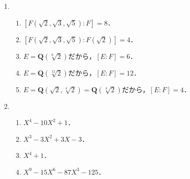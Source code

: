 \documentclass[a4paper,10pt]{ltjsarticle}
\begin{document}
\begin{enumerate}[]
  \item \label{enshu:1.16} \ 
  \begin{enumerate}
    \item \label{enshu:1.16.1} $[F(\sqrt{2}, \sqrt{3}, \sqrt{5}) : F] = 8$．
    \item \label{enshu:1.16.2} $[F(\sqrt{2}, \sqrt{3}, \sqrt{5}) : F(\sqrt{2})] = 4$．
    \item \label{enshu:1.16.3} $E = \mathbf{Q}(\sqrt[6]{2})$だから，$[E : F] = 6$．
    \item \label{enshu:1.16.4} $E = \mathbf{Q}(\sqrt[12]{2})$だから，$[E : F] = 12$．
    \item \label{enshu:1.16.5} $E = \mathbf{Q}(\sqrt{2}, \sqrt[4]{2}) = \mathbf{Q}(\sqrt[4]{2})$だから，$[E : F] = 4$．
  \end{enumerate}

  \item \label{enshu:1.17} \
  \begin{enumerate}
    \item \label{enshu:1.17.1} $X^4 - 10X^2 + 1$．
    \item \label{enshu:1.17.2} $X^3 - 3X^2 + 3X - 3$．
    \item \label{enshu:1.17.3} $X^4 + 1$．
    \item \label{enshu:1.17.4} $X^9 - 15X^6 - 87X^3 - 125$．
  \end{enumerate}


\end{enumerate}
\end{document}

